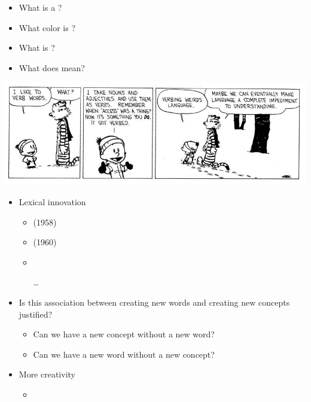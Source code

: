 \documentclass[headrule,footrule]{foils}
\begin{document}

\begin{itemize}
\item What is a ?
\item What color is ?
\item What is  ?
\item What does  mean?
\end{itemize}

\includegraphics[width=\textwidth]{pics/verbing.jpg}


\begin{itemize}
\item Lexical innovation
  \begin{itemize}
  \item {} (1958)
  \item {} (1960)
  \item {}
  \item[\ldots]
  \end{itemize}
\item   Is this association between creating new words and creating
  new concepts  justified?
  \begin{itemize}
  \item Can we have a new concept without a new word?\task
  \item Can we have a new word without a new concept?\task
  \end{itemize}
\item More creativity
  \begin{itemize}
  \item {}
  \end{itemize}
\end{itemize}

\end{document}
